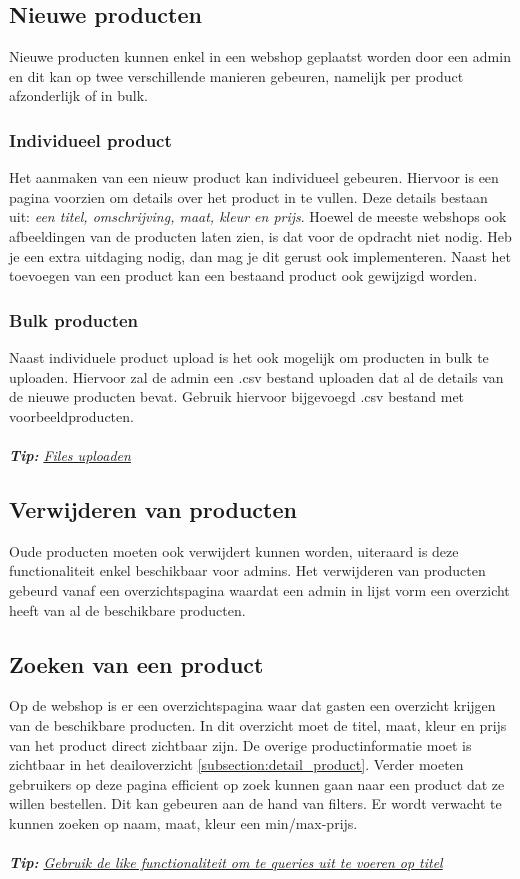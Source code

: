 \documentclass{article}
\begin{document}
\subsection{Nieuwe producten}
Nieuwe producten kunnen enkel in een webshop geplaatst worden door een admin en dit kan op twee verschillende manieren gebeuren, namelijk per product afzonderlijk of in bulk.

\subsubsection{Individueel product}
Het aanmaken van een nieuw product kan individueel gebeuren. Hiervoor is een pagina voorzien om details over het product in te vullen. Deze details bestaan uit: \textit{een titel, omschrijving, maat, kleur en prijs}. Hoewel de meeste webshops ook afbeeldingen van de producten laten zien, is dat voor de opdracht niet nodig. Heb je een extra uitdaging nodig, dan mag je dit gerust ook implementeren. Naast het toevoegen van een product kan een bestaand product ook gewijzigd worden.

\subsubsection{Bulk producten}
Naast individuele product upload is het ook mogelijk om producten in bulk te uploaden. Hiervoor zal de admin een .csv bestand uploaden dat al de details van de nieuwe producten bevat. Gebruik hiervoor bijgevoegd .csv bestand met voorbeeldproducten.
\\
\\
\textit{\textbf{Tip:} \href{https://phoenixframework.readme.io/v0.14.0/docs/file-uploads}{Files uploaden}}


\subsection{Verwijderen van producten}
Oude producten moeten ook verwijdert kunnen worden, uiteraard is deze functionaliteit enkel beschikbaar voor admins. Het verwijderen van producten gebeurd vanaf een overzichtspagina waardat een admin in lijst vorm een overzicht heeft van al de beschikbare producten.

\subsection{Zoeken van een product}
Op de webshop is er een overzichtspagina waar dat gasten een overzicht krijgen van de beschikbare producten. In dit overzicht moet de titel, maat, kleur en prijs van het product direct zichtbaar zijn. De overige productinformatie moet is zichtbaar in het deailoverzicht \ref{subsection:detail_product}. Verder moeten gebruikers op deze pagina efficient op zoek kunnen gaan naar een product dat ze willen bestellen. Dit kan gebeuren aan de hand van filters. Er wordt verwacht te kunnen zoeken op naam, maat, kleur een min/max-prijs. 
\\
\\
\textit{\textbf{Tip:} \href{https://hexdocs.pm/ecto/Ecto.Query.API.html}{Gebruik de like functionaliteit om te queries uit te voeren op titel}}
\end{document}
